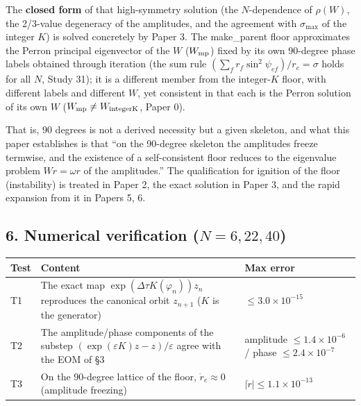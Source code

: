 \documentclass[
  a4paper,
]{ltjsarticle}
\newcounter{none} %
\begin{document}
The \textbf{closed form} of that high-symmetry solution (the
\(N\)-dependence of \(\rho(W)\), the 2/3-value degeneracy of the
amplitudes, and the agreement with \(\sigma_{\max}\) of the integer
\(K\)) is solved concretely by Paper 3. The make\_parent floor
approximates the Perron principal eigenvector of the \(W\)
(\(W_{\rm mp}\)) fixed by its own 90-degree phase labels obtained
through iteration (the sum rule
\((\sum_f r_f\sin^2\psi_{ef})/r_e=\sigma\) holds for all \(N\), Study
31); it is a different member from the integer-\(K\) floor, with
different labels and different \(W\), yet consistent in that each is the
Perron solution of its own \(W\) (\(W_{\rm mp}\neq W_{\rm integerK}\),
Paper 0).

That is, 90 degrees is not a derived necessity but a given skeleton, and
what this paper establishes is that ``on the 90-degree skeleton the
amplitudes freeze termwise, and the existence of a self-consistent floor
reduces to the eigenvalue problem \(Wr=\omega r\) of the amplitudes.''
The qualification for ignition of the floor (instability) is treated in
Paper 2, the exact solution in Paper 3, and the rapid expansion from it
in Papers 5, 6.

\subsection{\texorpdfstring{6. Numerical verification
(\(N=6,22,40\))}{6. Numerical verification (N=6,22,40)}}\label{numerical-verification-n62240}

{\def\LTcaptype{none} %
\begin{longtable}[]{@{}
  >{\raggedright\arraybackslash}p{}
  >{\raggedright\arraybackslash}p{}
  >{\raggedright\arraybackslash}p{}@{}}
\toprule\noalign{}
\begin{minipage}[b]{\linewidth}\raggedright
Test
\end{minipage} & \begin{minipage}[b]{\linewidth}\raggedright
Content
\end{minipage} & \begin{minipage}[b]{\linewidth}\raggedright
Max error
\end{minipage} \\
\midrule\noalign{}
\endhead
\bottomrule\noalign{}
\endlastfoot
T1 & The exact map \(\exp(\Delta\tau K(\varphi_n))z_n\) reproduces the
canonical orbit \(z_{n+1}\) (\(K\) is the generator) &
\(\le3.0\times10^{-15}\) \\
T2 & The amplitude/phase components of the substep
\((\exp(\varepsilon K)z-z)/\varepsilon\) agree with the EOM of §3 &
amplitude \(\le1.4\times10^{-6}\) / phase \(\le2.4\times10^{-7}\) \\
T3 & On the 90-degree lattice of the floor, \(\dot r_e\approx0\)
(amplitude freezing) & \(|\dot r|\le1.1\times10^{-13}\) \\
\end{longtable}
}
\end{document}
